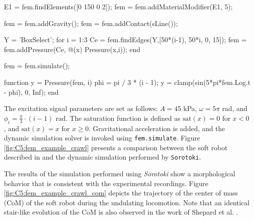 \begin{example}
\begin{matlabcode}
E1  = fem.findElements([0 150 0 2]);
fem = fem.addMaterialModifier(E1, 5);

fem = fem.addGravity();
fem = fem.addContact(sLine());

Y = 'BoxSelect';
for i = 1:3
    Ce = fem.findEdges(Y,[50*(i-1), 50*i, 0, 15]);
    fem = fem.addPressure(Ce, @(x) Pressure(x,i));
end

fem = fem.simulate();

function y = Pressure(fem, i)
    phi = pi / 3 * (i - 1);
    y = clamp(sin(5*pi*fem.Log.t - phi), 0, Inf);
end
\end{matlabcode}
\vfill
The excitation signal parameters are set as follows: $A = 45$ \si{\kilo \pascal}, $\omega = 5 \pi$ \si{\radian}, and $\phi_i = \frac{\pi}{3} \cdot (i-1)$ \si{\radian}. The saturation function is defined as $\textrm{sat}(x) = 0$ for $x < 0$, and $\textrm{sat}(x) = x$ for $x \geq 0$. Gravitational acceleration is added, and the dynamic simulation solver is invoked using \texttt{fem.simulate}. Figure \ref{fig:C5:fem_example_crawl} presents a comparison between the soft robot described in \cite{Shepherd2011Dec} and the dynamic simulation performed by \texttt{Sorotoki}.

The results of the simulation performed using \textit{Sorotoki} show a morphological behavior that is consistent with the experimental recordings. Figure \ref{fig:C5:fem_example_crawl_com} depicts the trajectory of the center of mass (CoM) of the soft robot during the undulating locomotion. Note that an identical stair-like evolution of the CoM is also observed in the work of Shepard et al. \cite{Shepherd2011Dec}. 
\vfill
\end{example}

%

